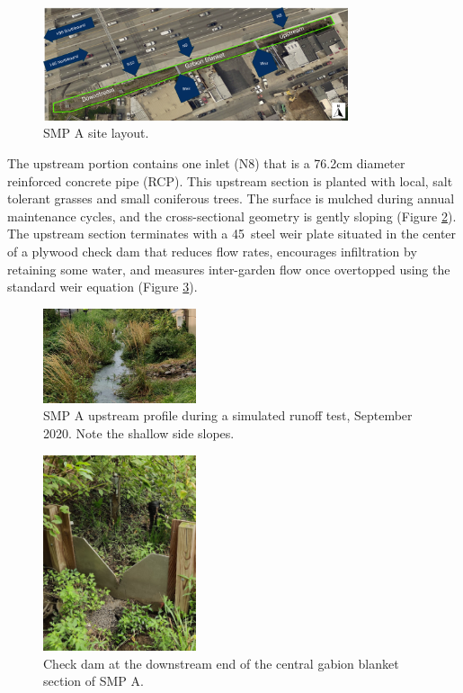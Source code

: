 \begin{figure}[ht!]
	\centering
	\includegraphics[width=0.8\textwidth]{gfx/chapter-instrumentation/site-layout.png}
	\caption{SMP A site layout.}
	\label{fig:site-layout}
\end{figure}

The upstream portion contains one inlet (N8) that is a 76.2cm diameter reinforced concrete pipe (RCP).
This upstream section is planted with local, salt tolerant grasses and small coniferous trees.
The surface is mulched during annual maintenance cycles, and the cross-sectional geometry is gently sloping (Figure \ref{fig:us-profile}).
The upstream section terminates with a 45\degree\ steel weir plate situated in the center of a plywood check dam that reduces flow rates, encourages infiltration by retaining some water, and measures inter-garden flow once overtopped using the standard weir equation (Figure \ref{fig:check-dam}).

\begin{figure}[ht!]
	\centering
	\includegraphics[width=0.4\textwidth]{gfx/chapter-instrumentation/smpa_upstream_profile.jpg}
	\caption[SMP A upstream profile during a simulated runoff test, September 2020.]{SMP A upstream profile during a simulated runoff test, September 2020. Note the shallow side slopes.}
	\label{fig:us-profile}
\end{figure}

\begin{figure}[ht!]
	\centering
	\includegraphics[width=0.4\textwidth]{gfx/chapter-instrumentation/check-dam-weir.jpg}
	\caption{Check dam at the downstream end of the central gabion blanket section of SMP A.}
	\label{fig:check-dam}
\end{figure}


